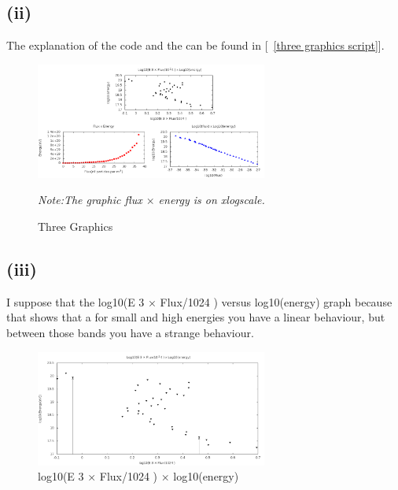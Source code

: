 \documentclass[twocolumn]{article}
\begin{document}
\subsection{(ii)}
The explanation of the code and the can be found in [~\ref{three graphics script}].

\begin{figure}[h!]
\begin{center}
\includegraphics[width=3in]{fig3.png}
\caption{Three Graphics}
\label{Three Graphics.}
\emph{Note:The graphic flux $\times$ energy is on xlogscale.}
\end{center}
\end{figure}

\subsection{(iii)}
I suppose that the log10(E 3 × Flux/1024 ) versus log10(energy) graph because that shows that a for small and high energies you have a linear behaviour, but between those bands you have a strange behaviour.

\begin{figure}[h!]
\begin{center}
\includegraphics[width=3in]{fig4.pdf}
\caption{log10(E 3 × Flux/1024 ) $\times$ log10(energy)}
\label{}
\end{center}
\end{figure}
\newpage
\end{document}
